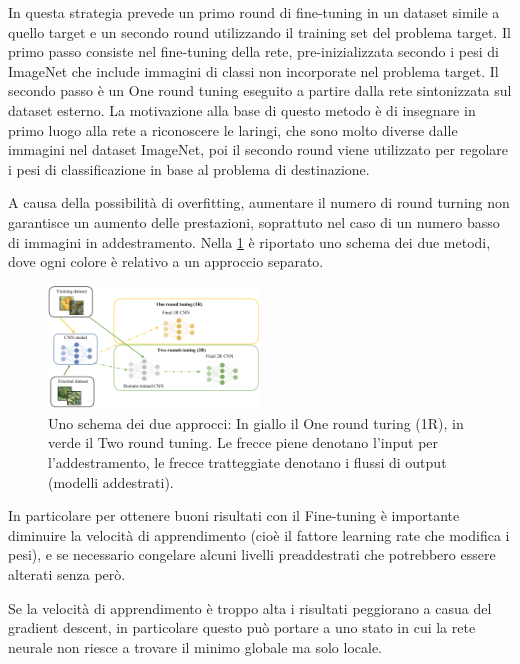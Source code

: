 In questa strategia prevede un primo round di fine-tuning in un dataset simile a quello target e un secondo round utilizzando il training set del problema target. Il primo passo consiste nel fine-tuning della rete, pre-inizializzata secondo i pesi di ImageNet che include immagini di classi non incorporate nel problema target. Il secondo passo è un One round tuning eseguito a partire dalla rete sintonizzata sul dataset esterno. La motivazione alla base di questo metodo è di insegnare in primo luogo alla rete a riconoscere le laringi, che sono molto diverse dalle immagini nel dataset ImageNet, poi il secondo round viene utilizzato per regolare i pesi di classificazione in base al problema di destinazione\cite{lumini_plankton}.


A causa della possibilità di \gls{overfitting}, aumentare il numero di round turning non garantisce un aumento delle prestazioni, soprattuto nel caso di un numero basso di immagini in addestramento\cite{lumini_plankton}. Nella \cref{fig:tl_2rt}  è riportato uno schema dei due metodi, dove ogni colore è relativo a un approccio separato. 

\begin{figure}[ht]
    \centering
    \includegraphics[width=0.5\textwidth]{transfer-learning/tl_2rt.pdf}
    \caption{Uno schema dei due approcci: In giallo il One round turing (1R), in verde il Two round tuning. Le frecce piene denotano l'input per l'addestramento, le frecce tratteggiate denotano i flussi di output (modelli addestrati).}
    \label{fig:tl_2rt}
\end{figure}

In particolare per ottenere buoni risultati con il Fine-tuning è importante diminuire la velocità di apprendimento (cioè il fattore learning rate che modifica i pesi), e se necessario congelare alcuni livelli preaddestrati che potrebbero essere alterati senza però.

Se la velocità di apprendimento è troppo alta i risultati peggiorano a casua del gradient descent, in particolare questo può portare a uno stato in cui la rete neurale non riesce a trovare il minimo globale ma solo locale\cite{joel_ft_tl_lfs}\cite{joel_tl}.

